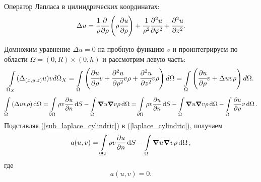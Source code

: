 \documentclass{report}
\begin{document}
Оператор Лапласа в цилиндрических координатах:
\begin{equation}
	\Delta u = \cfrac{1}{\rho}\cfrac{\partial}{\partial \rho}\left(\rho\cfrac{\partial u}{\partial \rho}\right) + \cfrac{1}{\rho^2}\cfrac{\partial^2u}{\partial \varphi^2}+\cfrac{\partial^2u}{\partial z^2}.
\end{equation}

Домножим уравнение $\Delta u = 0$ на пробную функцию $v$ и проинтегрируем по области $\Omega = (0,R)\times(0,h)$ и рассмотрим левую часть:
\begin{equation}\label{laplace_cylindric}
	\int\limits_{\Omega_{X}} (\Delta_{(x,y,z)} u) v d\Omega_{X} = \int\limits_{\Omega} \left( \cfrac{\partial u}{\partial \rho}v + \cfrac{\partial^2u}{\partial \rho^2}v\rho + \cfrac{\partial^2u}{\partial z^2}v\rho \right) d\Omega = \int\limits_{\Omega} \left( \cfrac{\partial u}{\partial \rho}v + \Delta u v\rho \right) d\Omega.
\end{equation}
\begin{equation}\label{sub_laplace_cylindric}
	\int\limits_{\Omega} \left( \Delta u v\rho \right) \dd{\Omega} = \int\limits_{\partial \Omega}\rho v \pdv{u}{n}\dd{S}-\int\limits_{\Omega}\grad{u}\grad{v\rho}\dd{\Omega}=\int\limits_{\partial \Omega}\rho v \pdv{u}{n}\dd{S}-\int\limits_{\Omega}\grad{u}\grad{v}\rho\dd{\Omega}-\int\limits_{\Omega}\pdv{u}{\rho}v\dd{\Omega}.
\end{equation}
Подставляя (\ref{sub_laplace_cylindric}) в (\ref{laplace_cylindric}), получаем
\begin{equation}
	a(u,v)=\int\limits_{\partial \Omega}\rho v \pdv{u}{n}\dd{S}-\int\limits_{\Omega}\grad{u}\grad{v}\rho\dd{\Omega},
\end{equation}
где $$a(u,v)=0.$$
\end{document}
